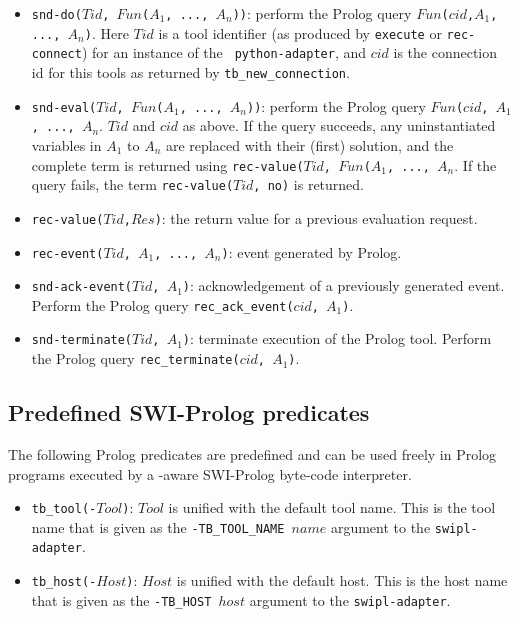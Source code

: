 {\begin{itemize}
\item {\tt snd-do($Tid$, $Fun$($A_1$, ..., $A_n$))}: perform the Prolog
query
{\tt $Fun$($cid$,$A_1$, ..., $A_n$)}. Here $Tid$ is a tool identifier
(as produced by {\tt execute} or {\tt rec-connect}) for an instance of the {\tt
python-adapter}, and $cid$ is the connection id for this tools as returned
by {\tt tb\_new\_connection}.
\item {\tt snd-eval($Tid$, $Fun$($A_1$, ..., $A_n$))}: perform the Prolog
query
{\tt $Fun$($cid$, $A_1$, ..., $A_n$}. $Tid$ and $cid$ as above.
If the query succeeds, any uninstantiated variables in $A_1$ to $A_n$ are
replaced with their (first) solution, and the complete term is returned
using {\tt rec-value($Tid$, $Fun$($A_1$, ..., $A_n$}.
If the query fails, the term {\tt rec-value($Tid$, no)}
is returned.
\item {\tt rec-value($Tid$,$Res$)}: the return value for a previous evaluation request.
\item {\tt rec-event($Tid$, $A_1$, ..., $A_n$)}: event generated by Prolog.
\item {\tt snd-ack-event($Tid$, $A_1$)}: acknowledgement of
a previously generated event. Perform the Prolog query
{\tt rec\_ack\_event($cid$, $A_1$)}.
\item {\tt snd-terminate($Tid$, $A_1$)}: terminate execution of the
Prolog tool. Perform the Prolog query
{\tt rec\_terminate($cid$, $A_1$)}.
\end{itemize}


\subsection{\label{Prolog-predicates}Predefined SWI-Prolog predicates}
The following Prolog predicates are predefined and can be used freely in
Prolog programs executed by a \TB -aware SWI-Prolog byte-code interpreter.

\begin{itemize}

\item {\tt tb\_tool(-$Tool$)}: $Tool$ is unified with the default tool name.
      This is the tool name that is given as the {\tt -TB\_TOOL\_NAME $name$}
      argument to the {\tt swipl-adapter}.

\item {\tt tb\_host(-$Host$)}: $Host$ is unified with the default host.
      This is the host name that is given as the {\tt -TB\_HOST $host$}
      argument to the {\tt swipl-adapter}.


\end{itemize}}
